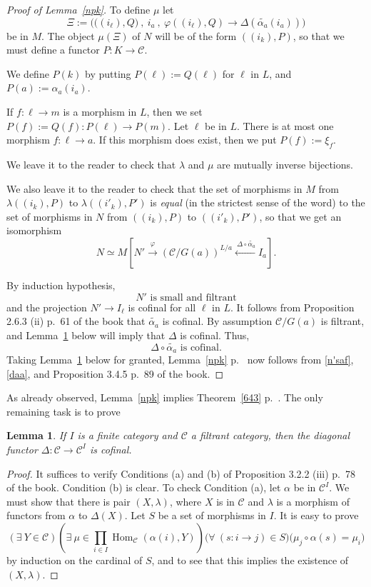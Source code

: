 \documentclass[12pt]{article}
\newtheorem{lem}[thm]{Lemma}
\theoremstyle{remark}
\theoremstyle{definition}
\newcommand{\C}{\mathcal C}
\newcommand{\pp}{\varphi}
\DeclareMathOperator{\Hom}{Hom}
\begin{document}
\begin{proof}[Proof of Lemma~\ref{npk}]
To define $\mu$ let 
$$
\Xi:=\Big(\big((i_\ell),Q\big)\ ,\ i_a\ ,\ \pp((i_\ell),Q)\to\Delta(\widetilde{\alpha_a}(i_a))\Big)
$$ 
be in $M$. The object $\mu(\Xi)$ of $N$ will be of the form $((i_k),P)$, so that we must define a functor $P:K\to\C$. 

We define $P(k)$ by putting $P(\ell):=Q(\ell)$ for $\ell$ in $L$, and $P(a):=\alpha_a(i_a)$. 

If $f:\ell\to m$ is a morphism in $L$, then we set $P(f):=Q(f):P(\ell)\to P(m)$. Let $\ell$ be in $L$. There is at most one morphism $f:\ell\to a$. If this morphism does exist, then we put $P(f):=\xi_f$. 

We leave it to the reader to check that $\lambda$ and $\mu$ are mutually inverse bijections. 

We also leave it to the reader to check that the set of morphisms in $M$ from $\lambda((i_k),P)$ to $\lambda((i'_k),P')$ is \emph{equal} (in the strictest sense of the word) to the set of morphisms in $N$ from $((i_k),P)$ to $((i'_k),P')$, so that we get an isomorphism 
$$ 
N\simeq M\left[N'\xrightarrow{\pp}(\C/G(a))^{L/a}\xleftarrow{\ \Delta\circ\widetilde{\alpha_a}}I_a\right]. 
$$

By induction hypothesis, 
%
\begin{equation}\label{n'saf}
N'\text{ is small and filtrant}
\end{equation} 
%
and the projection $N'\to I_\ell$ is cofinal for all $\ell$ in $L$. It follows from Proposition 2.6.3 (ii) p.~61 of the book that $\widetilde{\alpha_a}$ is cofinal. By assumption $\C/G(a)$ is filtrant, and Lemma~\ref{delta} below will imply that $\Delta$ is cofinal. Thus, 
%
\begin{equation}\label{daa}
\Delta\circ\widetilde{\alpha_a}\text{ is cofinal.}
\end{equation} 
% 
Taking Lemma~\ref{delta} below for granted, Lemma~\ref{npk} p.~\pageref{npk} now follows from \eqref{n'saf}, \eqref{daa}, and Proposition 3.4.5 p.~89 of the book. 
\end{proof} 

As already observed, Lemma~\ref{npk} implies Theorem~\ref{643} p.~\pageref{643}. The only remaining task is to prove 

\begin{lem}\label{delta}
If $I$ is a finite category and $\C$ a filtrant category, then the diagonal functor $\Delta:\C\to\C^I$ is cofinal.
\end{lem}

\begin{proof}
It suffices to verify Conditions (a) and (b) of Proposition 3.2.2 (iii) p.~78 of the book. Condition (b) is clear. To check Condition (a), let $\alpha$ be in $\C^I$. We must show that there is pair $(X,\lambda)$, where $X$ is in $\C$ and $\lambda$ is a morphism of functors from $\alpha$ to $\Delta(X)$. Let $S$ be a set of morphisms in $I$. It is easy to prove 
$$
(\exists\ Y\in\C)\left(\exists\ \mu\in\prod_{i\in I}\Hom_\C(\alpha(i),Y)\right)\Big(\forall\ (s:i\to j)\in S\Big)\Big(\mu_{j}\circ\alpha(s)=\mu_i\Big) 
$$ 
by induction on the cardinal of $S$, and to see that this implies the existence of $(X,\lambda)$.
\end{proof} 
\end{document}

